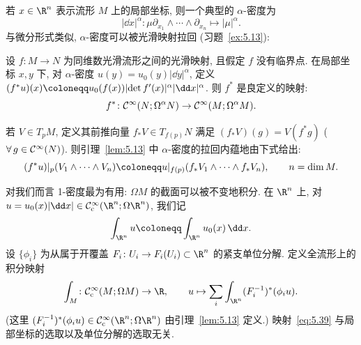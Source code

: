 若 $x \in \R^n$ 表示流形 $M$ 上的局部坐标, 则一个典型的 $\alpha$-密度为
\begin{equation}\label{eq:5.36}
    |\dd x|^\alpha \colon \mu \partial_{x_1} \wedge \cdots \wedge \partial_{x_n} \mapsto |\mu|^\alpha.
\end{equation}
与微分形式类似, $\alpha$-密度可以被光滑映射拉回 (习题~\ref{ex:5.13}):

\begin{lemma}[密度的拉回]\label{lem:5.13}
设 $f \colon M \to N$ 为同维数光滑流形之间的光滑映射, 且假定 $f$ 没有临界点. 在局部坐标 $x, y$ 下, 对 $\alpha$-密度 $u(y) = u_0(y) |\dd y|^\alpha$, 定义 $(f^* u)(x) \defeq u_0(f(x)) |\!\det f'(x)|^\alpha |\dd x|^\alpha$. 则 $f^*$ 是良定义的映射:
\begin{equation}\label{eq:5.37}
    f^* \colon \mathcal{C}^\infty(N; \Omega^\alpha N) \to \mathcal{C}^\infty(M; \Omega^\alpha M).
\end{equation}
\end{lemma}

\begin{remark}[内蕴表述]\label{rem:5.14}
若 $V \in T_p M$, 定义其前推向量 $f_* V \in T_{f(p)} N$ 满足 $(f_* V)(g) = V(f^* g)$ ($\forall\,g \in \mathcal{C}^\infty(N)$). 则引理~\ref{lem:5.13} 中 $\alpha$-密度的拉回内蕴地由下式给出:
\[
    (f^* u)|_p(V_1 \wedge \cdots \wedge V_n) \defeq u|_{f(p)}(f_* V_1 \wedge \cdots \wedge f_* V_n), \qquad n = \dim M.
\]
\end{remark}

\begin{proposition}[1-密度的积分]\label{prop:5.15}
对我们而言 1-密度最为有用: $\Omega M$ 的截面可以被不变地积分. 在 $\R^n$ 上, 对 $u = u_0(x) |\dd x| \in \mathcal{C}_{\mathrm{c}}^\infty(\R^n; \Omega \R^n)$, 我们记
\begin{equation}\label{eq:5.38}
    \int_{\R^n} u \defeq \int_{\R^n} u_0(x) \,\dd x.
\end{equation}
设 $\{\phi_i\}$ 为从属于开覆盖 $F_i \colon U_i \to F_i(U_i) \subset \R^n$ 的紧支单位分解. 定义全流形上的积分映射
\begin{equation}\label{eq:5.39}
    \int_M \colon \mathcal{C}_{\mathrm{c}}^\infty(M; \Omega M) \to \R, \qquad u \mapsto \sum_i \int_{\R^n} (F_i^{-1})^*(\phi_i u).
\end{equation}
(这里 $(F_i^{-1})^*(\phi_i u) \in \mathcal{C}_{\mathrm{c}}^\infty(\R^n; \Omega \R^n)$ 由引理~\ref{lem:5.13} 定义.) 映射~\eqref{eq:5.39} 与局部坐标的选取以及单位分解的选取无关.
\end{proposition}

